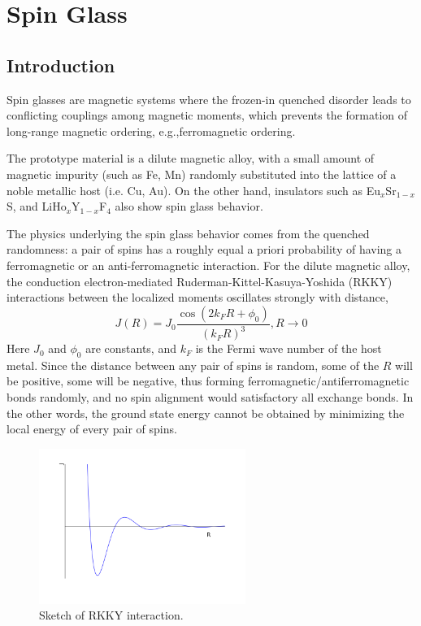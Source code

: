 \chapter{Spin Glass}
\label{chap:SGintro}
\section{Introduction}
Spin glasses are magnetic systems where the frozen-in quenched  
disorder leads to conflicting couplings among magnetic moments, which prevents the formation 
of long-range magnetic ordering, e.g.,ferromagnetic ordering.

The prototype material is a dilute magnetic alloy, with a small amount of 
magnetic impurity (such as Fe, Mn) randomly substituted into the lattice of a 
noble metallic host (i.e. Cu, Au). On the other hand, insulators such as 
Eu$_x$Sr$_{1-x}$S, and LiHo$_{x}$Y$_{1-x}$F$_{4}$ also show spin glass behavior.
 

The physics underlying the spin glass behavior comes from the quenched 
randomness: a pair of spins has a roughly equal a priori probability of having
a ferromagnetic or an anti-ferromagnetic interaction. For the dilute magnetic 
alloy, the conduction electron-mediated 
Ruderman-Kittel-Kasuya-Yoshida (RKKY) interactions between the localized moments
 oscillates strongly with distance, 
 \begin{equation}
   \label{eq:RKKY}
   J(R)=J_0\frac{\cos(2k_FR+\phi_0)}{(k_FR)^3}, R\rightarrow 0
 \end{equation}
Here $J_0$ and $\phi_0$ are constants, and $k_F$ is the Fermi wave number of the
host metal. Since the distance between any pair of spins is random, some of the $R$
will be positive, some will be negative,
thus forming ferromagnetic/antiferromagnetic bonds randomly, and no spin 
alignment would satisfactory all exchange bonds. In the other words, the 
ground state energy cannot be obtained by minimizing the local energy 
of every pair of spins.

\begin{figure}[!h]
  \label{fig:rkky}
  \centering
  \includegraphics[width=0.6\textwidth]{img/RKKY.png}
  \caption{Sketch of RKKY interaction.}
\end{figure}

